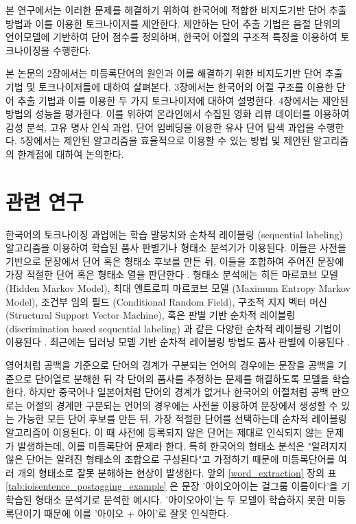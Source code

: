 \documentclass[oneside, ko,phd]{snuthesis_utf8_kor}
\begin{document}
본 연구에서는 이러한 문제를 해결하기 위하여 한국어에 적합한 비지도기반 단어 추출 방법과 이를 이용한 토크나이저를 제안한다.
제안하는 단어 추출 기법은 음절 단위의 언어모델에 기반하여 단어 점수를 정의하며, 한국어 어절의 구조적 특징을 이용하여 토크나이징을 수행한다.

본 논문의 2장에서는 미등록단어의 원인과 이를 해결하기 위한 비지도기반 단어 추출 기법 및 토크나이저들에 대하여 살펴본다.
3장에서는 한국어의 어절 구조를 이용한 단어 추출 기법과 이를 이용한 두 가지 토크나이저에 대하여 설명한다.
4장에서는 제안된 방법의 성능을 평가한다.
이를 위하여 온라인에서 수집된 영화 리뷰 데이터를 이용하여 감성 분석, 고유 명사 인식 과업, 단어 임베딩을 이용한 유사 단어 탐색 과업을 수행한다.
5장에서는 제안된 알고리즘을 효율적으로 이용할 수 있는 방법 및 제안된 알고리즘의 한계점에 대하여 논의한다.

\section{관련 연구}

한국어의 토크나이징 과업에는 학습 말뭉치와 순차적 레이블링 (sequential labeling) 알고리즘을 이용하여 학습된 품사 판별기나 형태소 분석기가 이용된다. \cite{konlpy,shim2007made}
이들은 사전을 기반으로 문장에서 단어 혹은 형태소 후보를 만든 뒤, 이들을 조합하여 주어진 문장에 가장 적절한 단어 혹은 형태소 열을 판단한다 \cite{brants2000tnt}.
형태소 분석에는 히든 마르코브 모델 (Hidden Markov Model), 최대 엔트로피 마르코브 모델 (Maximum Entropy Markov Model),  조건부 임의 필드 (Conditional Random Field), 구조적 지지 벡터 머신 (Structural Support Vector Machine), 혹은 판별 기반 순차적 레이블링 (discrimination based sequential labeling) 과 같은 다양한 순차적 레이블링 기법이 이용된다 \cite{krogh1994hidden, mccallum2000maximum, kudo2004applying, taskar2004max, tsochantaridis2005large, bohnet2012transition, na2012crfs}.
최근에는 딥러닝 모델 기반 순차적 레이블링 방법도 품사 판별에 이용된다 \cite{zheng2013deep, collobert2011natural}.

영어처럼 공백을 기준으로 단어의 경계가 구분되는 언어의 경우에는 문장을 공백을 기준으로 단어열로 분해한 뒤 각 단어의 품사를 추정하는 문제를 해결하도록 모델을 학습한다.
하지만 중국어나 일본어처럼 단어의 경계가 없거나 한국어의 어절처럼 공백 만으로는 어절의 경계만 구분되는 언어의 경우에는 사전을 이용하여 문장에서 생성할 수 있는 가능한 모든 단어 후보를 만든 뒤, 가장 적절한 단어를 선택하는데 순차적 레이블링 알고리즘이 이용된다.
이 때 사전에 등록되지 않은 단어는 제대로 인식되지 않는 문제가 발생하는데, 이를 미등록단어 문제라 한다.
특히 한국어의 형태소 분석은 "알려지지 않은 단어는 알려진 형태소의 조합으로 구성된다"고 가정하기 때문에 미등록단어를 여러 개의 형태소로 잘못 분해하는 현상이 발생한다.
앞의 \ref{word_extraction} 장의 표 \ref{tab:ioisentence_postagging_example} 은 문장 '아이오아이는 걸그룹 이름이다'을 기학습된 형태소 분석기로 분석한 예시다.
'아이오아이'는 두 모델이 학습하지 못한 미등록단이기 때문에 이를 '아이오 + 아이'로 잘못 인식한다.
\end{document}
